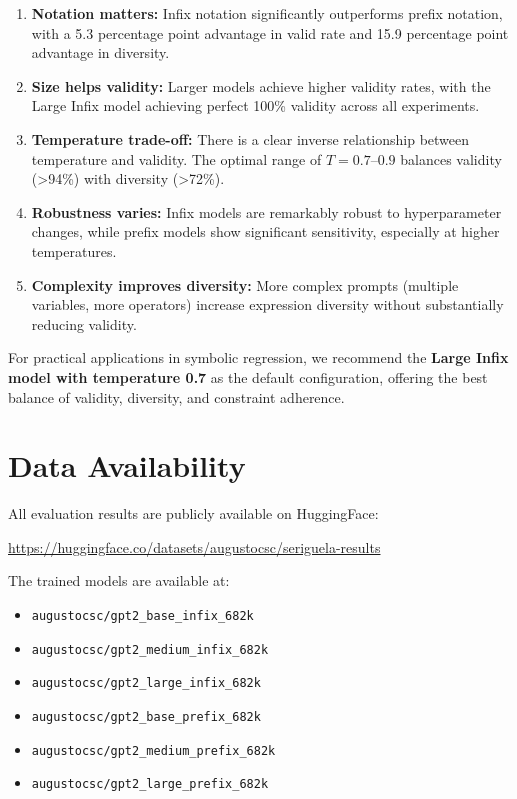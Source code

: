 \documentclass[11pt,a4paper]{article}
\begin{document}
\begin{enumerate}
    \item \textbf{Notation matters:} Infix notation significantly outperforms prefix notation, with a 5.3 percentage point advantage in valid rate and 15.9 percentage point advantage in diversity.

    \item \textbf{Size helps validity:} Larger models achieve higher validity rates, with the Large Infix model achieving perfect 100\% validity across all experiments.

    \item \textbf{Temperature trade-off:} There is a clear inverse relationship between temperature and validity. The optimal range of $T=0.7$--$0.9$ balances validity (>94\%) with diversity (>72\%).

    \item \textbf{Robustness varies:} Infix models are remarkably robust to hyperparameter changes, while prefix models show significant sensitivity, especially at higher temperatures.

    \item \textbf{Complexity improves diversity:} More complex prompts (multiple variables, more operators) increase expression diversity without substantially reducing validity.
\end{enumerate}

For practical applications in symbolic regression, we recommend the \textbf{Large Infix model with temperature 0.7} as the default configuration, offering the best balance of validity, diversity, and constraint adherence.

\section*{Data Availability}

All evaluation results are publicly available on HuggingFace:
\begin{center}
\url{https://huggingface.co/datasets/augustocsc/seriguela-results}
\end{center}

The trained models are available at:
\begin{itemize}
    \item \texttt{augustocsc/gpt2\_base\_infix\_682k}
    \item \texttt{augustocsc/gpt2\_medium\_infix\_682k}
    \item \texttt{augustocsc/gpt2\_large\_infix\_682k}
    \item \texttt{augustocsc/gpt2\_base\_prefix\_682k}
    \item \texttt{augustocsc/gpt2\_medium\_prefix\_682k}
    \item \texttt{augustocsc/gpt2\_large\_prefix\_682k}
\end{itemize}
\end{document}
